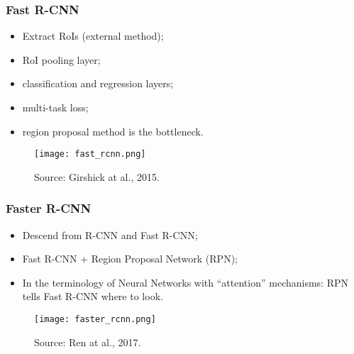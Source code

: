 \documentclass{beamer}
\begin{document}
		\begin{frame}\frametitle{Fast R-CNN}
			\begin{itemize}
				\item Extract RoIs (external method);
				\item RoI pooling layer;
				\item classification and regression layers;
				\item multi-task loss;
				\item region proposal method is the bottleneck.
			\end{itemize}
			\begin{figure}[th!]
				\centering
				\texttt{[image: fast\_rcnn.png]}
				\caption{Source: {Girshick at al., 2015}.
				}
				\label{fig:Fast_R-CNN}
			\end{figure}
		\end{frame}


		\begin{frame}\frametitle{Faster R-CNN}
			\begin{itemize}
				\item Descend from R-CNN and Fast R-CNN;
				\item Fast R-CNN + Region Proposal Network (RPN);
				\item In the terminology of Neural Networks with “attention” mechanisms:
				RPN tells Fast R-CNN where to look.
			\end{itemize}
			\begin{figure}[th!]
				\centering
				\texttt{[image: faster\_rcnn.png]}
				\caption{Source: {Ren at al., 2017}.
				}
				\label{fig:Faster_R-CNN}
			\end{figure}
		\end{frame}
\end{document}
